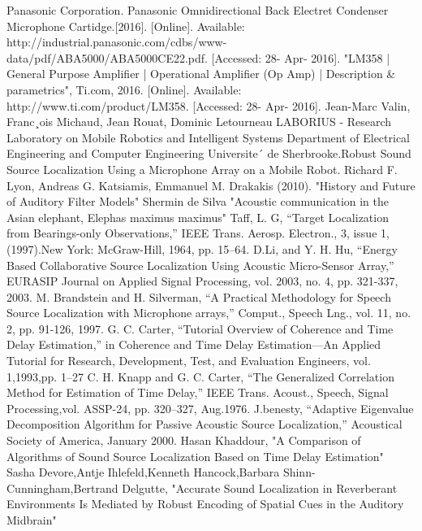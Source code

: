 \documentclass[11pt]{article}
\numberwithin{figure}{section}
\numberwithin{table}{section}
\begin{document}
\begin{thebibliography}{1}
 Panasonic Corporation. Panasonic Omnidirectional Back Electret Condenser Microphone Cartidge.[2016].  [Online]. Available: http://industrial.panasonic.com/cdbs/www-data/pdf/ABA5000/ABA5000CE22.pdf. [Accessed: 28- Apr- 2016].
"LM358 | General Purpose Amplifier | Operational Amplifier (Op Amp) | Description \& parametrics", Ti.com, 2016. [Online]. Available: http://www.ti.com/product/LM358. [Accessed: 28- Apr- 2016].
Jean-Marc Valin, Franc¸ois Michaud, Jean Rouat, Dominic Letourneau LABORIUS - Research Laboratory on Mobile Robotics and Intelligent Systems Department of Electrical Engineering and Computer Engineering Universite´ de Sherbrooke.Robust Sound Source Localization Using a Microphone Array on a Mobile Robot.
 Richard F. Lyon, Andreas G. Katsiamis, Emmanuel M. Drakakis (2010). "History and Future of Auditory Filter Models"
 Shermin de Silva "Acoustic communication in the Asian elephant,
Elephas maximus maximus"
 Taff, L. G, “Target Localization from Bearings-only Observations,”
IEEE Trans. Aerosp. Electron., 3, issue 1, (1997).New York: McGraw-Hill, 1964, pp. 15–64.
D.Li, and Y. H. Hu, “Energy Based Collaborative Source Localization
Using Acoustic Micro-Sensor Array,” EURASIP Journal on Applied
Signal Processing, vol. 2003, no. 4, pp. 321-337, 2003.
M. Brandstein and H. Silverman, “A Practical Methodology for Speech
Source Localization with Microphone arrays,” Comput., Speech Lng.,
vol. 11, no. 2, pp. 91-126, 1997.
 G. C. Carter, “Tutorial Overview of Coherence and Time Delay Estimation,”
in Coherence and Time Delay Estimation—An Applied Tutorial for Research, Development, Test, and Evaluation Engineers, vol. 1,1993,pp. 1–27
C. H. Knapp and G. C. Carter, “The Generalized Correlation Method for Estimation of Time Delay,” IEEE Trans. Acoust., Speech, Signal Processing,vol. ASSP-24, pp. 320–327, Aug.1976.
  J.benesty, “Adaptive Eigenvalue Decomposition Algorithm for Passive Acoustic Source Localization,” Acoustical Society of America, January 2000.
 Hasan Khaddour, "A Comparison of Algorithms of Sound Source Localization Based
on Time Delay Estimation"
 Sasha Devore,Antje Ihlefeld,Kenneth Hancock,Barbara Shinn-Cunningham,Bertrand Delgutte,
"Accurate Sound Localization in Reverberant Environments Is Mediated by Robust Encoding of Spatial Cues in the Auditory Midbrain"
\end{thebibliography}
\end{document}
